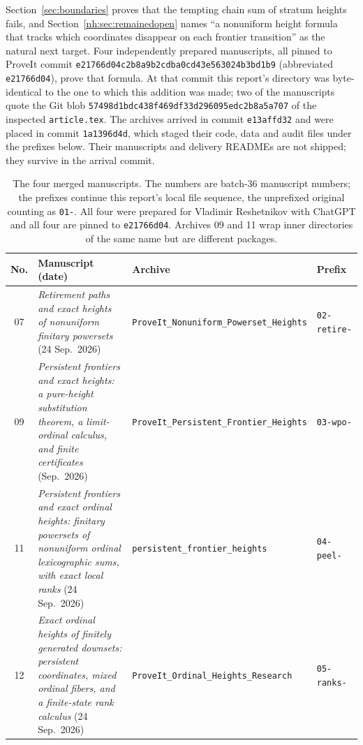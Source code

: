 \documentclass[11pt,a4paper]{article}
\theoremstyle{definition}
\theoremstyle{remark}
\begin{document}
Section~\ref{sec:boundaries} proves that the tempting chain sum of stratum
heights fails, and Section~\ref{nh:sec:remainedopen} names ``a nonuniform
height formula that tracks which coordinates disappear on each frontier
transition'' as the natural next target. Four independently prepared
manuscripts, all pinned to ProveIt commit
\texttt{e21766d04c2b8a9b2cdba0cd43e563024b3bd1b9} (abbreviated
\texttt{e21766d04}), prove that formula. At that commit this report's
directory was byte-identical to the one to which this addition was made;
two of the manuscripts quote the Git blob
\texttt{57498d1bdc438f469df33d296095edc2b8a5a707} of the inspected
\texttt{article.tex}. The archives arrived in commit \texttt{e13affd32} and
were placed in commit \texttt{1a1396d4d}, which staged their code, data and
audit files under the prefixes below. Their manuscripts and delivery
READMEs are not shipped; they survive in the arrival commit.

\begin{table}[htbp]
\centering\small
\renewcommand{\arraystretch}{1.18}
\begin{tabularx}{\linewidth}{@{}c>{\raggedright\arraybackslash}X>{\raggedright\arraybackslash}p{.24\linewidth}l@{}}
\toprule
No. & Manuscript (date) & Archive & Prefix\\
\midrule
07 & \emph{Retirement paths and exact heights of nonuniform finitary
powersets} (24 Sep.\ 2026) & \texttt{ProveIt\_Nonuniform\_\allowbreak Powerset\_Heights} & \texttt{02-retire-}\\
09 & \emph{Persistent frontiers and exact heights: a pure-height
substitution theorem, a limit-ordinal calculus, and finite certificates}
(Sep.\ 2026) & \texttt{ProveIt\_Persistent\_\allowbreak Frontier\_Heights} & \texttt{03-wpo-}\\
11 & \emph{Persistent frontiers and exact ordinal heights: finitary
powersets of nonuniform ordinal lexicographic sums, with exact local ranks}
(24 Sep.\ 2026) & \texttt{persistent\_frontier\_\allowbreak heights} & \texttt{04-peel-}\\
12 & \emph{Exact ordinal heights of finitely generated downsets: persistent
coordinates, mixed ordinal fibers, and a finite-state rank calculus}
(24 Sep.\ 2026) & \texttt{ProveIt\_Ordinal\_\allowbreak Heights\_Research} & \texttt{05-ranks-}\\
\bottomrule
\end{tabularx}
\caption{The four merged manuscripts. The numbers are batch-36 manuscript
numbers; the prefixes continue this report's local file sequence, the
unprefixed original counting as \texttt{01-}. All four were prepared for
Vladimir Reshetnikov with ChatGPT and all four are pinned to
\texttt{e21766d04}. Archives 09 and 11 wrap inner directories of the same
name but are different packages.}
\label{nh:tab:sources}
\end{table}
\end{document}
